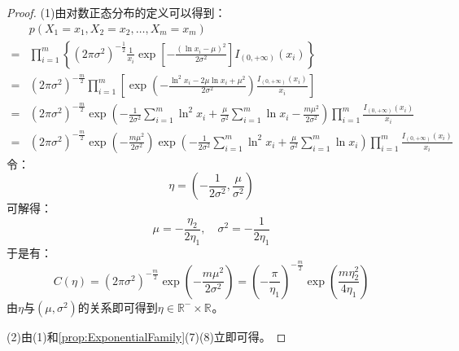 \begin{proof}
	(1)由对数正态分布的定义可以得到：
	\begin{align*}
		&p(X_1=x_1,X_2=x_2,\dots,X_m=x_m) \\
		=&\prod_{i=1}^{m}\left\{(2\pi\sigma^2)^{-\frac{1}{2}}\frac{1}{x_i}\exp\left[-\frac{(\ln x_i-\mu)^2}{2\sigma^2}\right]I_{(0,+\infty)}(x_i)\right\} \\
		=&(2\pi\sigma^2)^{-\frac{m}{2}}\prod_{i=1}^{m}\left[\exp\left(-\frac{\ln^2 x_i-2\mu\ln x_i+\mu^2}{2\sigma^2}\right)\frac{I_{(0,+\infty)}(x_i)}{x_i}\right] \\
		=&(2\pi\sigma^2)^{-\frac{m}{2}}\exp\left(-\frac{1}{2\sigma^2}\sum_{i=1}^{m}\ln^2 x_i+\frac{\mu}{\sigma^2}\sum_{i=1}^{m}\ln x_i-\frac{m\mu^2}{2\sigma^2}\right)\prod_{i=1}^{m}\frac{I_{(0,+\infty)}(x_i)}{x_i} \\
		=&(2\pi\sigma^2)^{-\frac{m}{2}}\exp\left(-\frac{m\mu^2}{2\sigma^2}\right)\exp\left(-\frac{1}{2\sigma^2}\sum_{i=1}^{m}\ln^2 x_i+\frac{\mu}{\sigma^2}\sum_{i=1}^{m}\ln x_i\right)\prod_{i=1}^{m}\frac{I_{(0,+\infty)}(x_i)}{x_i}
	\end{align*}
	令：
	\begin{equation*}
		\eta=\left(-\frac{1}{2\sigma^2},\frac{\mu}{\sigma^2}\right)
	\end{equation*}
	可解得：
	\begin{equation*}
		\mu=-\frac{\eta_2}{2\eta_1},\quad\sigma^2=-\frac{1}{2\eta_1}
	\end{equation*}
	于是有：
	\begin{equation*}
		C(\eta)=(2\pi\sigma^2)^{-\frac{m}{2}}\exp\left(-\frac{m\mu^2}{2\sigma^2}\right)=\left(-\frac{\pi}{\eta_1}\right)^{-\frac{m}{2}}\exp\left(\frac{m\eta_2^2}{4\eta_1}\right)
	\end{equation*}
	由$\eta$与$(\mu,\sigma^2)$的关系即可得到$\eta\in\mathbb{R}^{-}\times\mathbb{R}^{}$。\par
	(2)由(1)和\cref{prop:ExponentialFamily}(7)(8)立即可得。
\end{proof}

